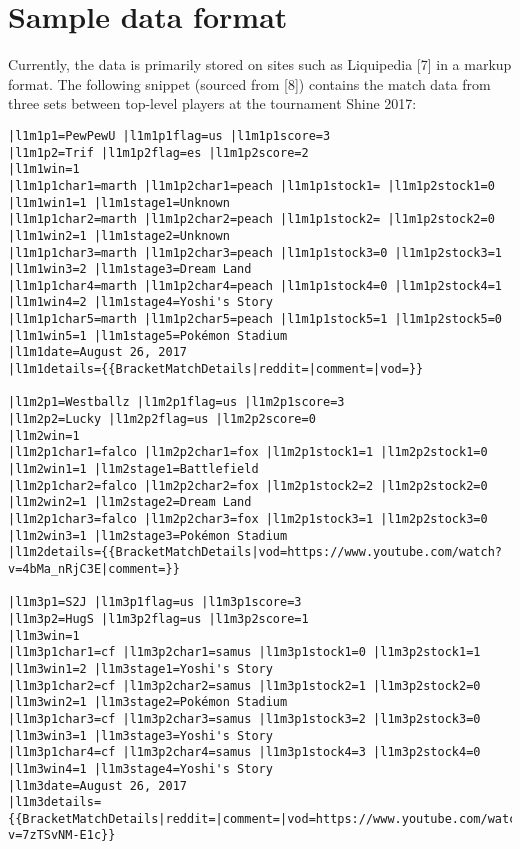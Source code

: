 \documentclass[10pt]{article}
\theoremstyle{definition}
\theoremstyle{remark}
\begin{document}
\hypertarget{sample-data-format}{%
\section{Sample data format}\label{sample-data-format}}

Currently, the data is primarily stored on sites such as Liquipedia
{[}7{]} in a markup format. The following snippet (sourced from {[}8{]})
contains the match data from three sets between top-level players at the
tournament Shine 2017:

\begin{verbatim}
|l1m1p1=PewPewU |l1m1p1flag=us |l1m1p1score=3
|l1m1p2=Trif |l1m1p2flag=es |l1m1p2score=2
|l1m1win=1
|l1m1p1char1=marth |l1m1p2char1=peach |l1m1p1stock1= |l1m1p2stock1=0 |l1m1win1=1 |l1m1stage1=Unknown
|l1m1p1char2=marth |l1m1p2char2=peach |l1m1p1stock2= |l1m1p2stock2=0 |l1m1win2=1 |l1m1stage2=Unknown
|l1m1p1char3=marth |l1m1p2char3=peach |l1m1p1stock3=0 |l1m1p2stock3=1 |l1m1win3=2 |l1m1stage3=Dream Land
|l1m1p1char4=marth |l1m1p2char4=peach |l1m1p1stock4=0 |l1m1p2stock4=1 |l1m1win4=2 |l1m1stage4=Yoshi's Story
|l1m1p1char5=marth |l1m1p2char5=peach |l1m1p1stock5=1 |l1m1p2stock5=0 |l1m1win5=1 |l1m1stage5=Pokémon Stadium
|l1m1date=August 26, 2017
|l1m1details={{BracketMatchDetails|reddit=|comment=|vod=}}

|l1m2p1=Westballz |l1m2p1flag=us |l1m2p1score=3
|l1m2p2=Lucky |l1m2p2flag=us |l1m2p2score=0
|l1m2win=1
|l1m2p1char1=falco |l1m2p2char1=fox |l1m2p1stock1=1 |l1m2p2stock1=0 |l1m2win1=1 |l1m2stage1=Battlefield
|l1m2p1char2=falco |l1m2p2char2=fox |l1m2p1stock2=2 |l1m2p2stock2=0 |l1m2win2=1 |l1m2stage2=Dream Land
|l1m2p1char3=falco |l1m2p2char3=fox |l1m2p1stock3=1 |l1m2p2stock3=0 |l1m2win3=1 |l1m2stage3=Pokémon Stadium
|l1m2details={{BracketMatchDetails|vod=https://www.youtube.com/watch?v=4bMa_nRjC3E|comment=}}

|l1m3p1=S2J |l1m3p1flag=us |l1m3p1score=3
|l1m3p2=HugS |l1m3p2flag=us |l1m3p2score=1
|l1m3win=1
|l1m3p1char1=cf |l1m3p2char1=samus |l1m3p1stock1=0 |l1m3p2stock1=1 |l1m3win1=2 |l1m3stage1=Yoshi's Story
|l1m3p1char2=cf |l1m3p2char2=samus |l1m3p1stock2=1 |l1m3p2stock2=0 |l1m3win2=1 |l1m3stage2=Pokémon Stadium
|l1m3p1char3=cf |l1m3p2char3=samus |l1m3p1stock3=2 |l1m3p2stock3=0 |l1m3win3=1 |l1m3stage3=Yoshi's Story
|l1m3p1char4=cf |l1m3p2char4=samus |l1m3p1stock4=3 |l1m3p2stock4=0 |l1m3win4=1 |l1m3stage4=Yoshi's Story
|l1m3date=August 26, 2017
|l1m3details={{BracketMatchDetails|reddit=|comment=|vod=https://www.youtube.com/watch?v=7zTSvNM-E1c}}
\end{verbatim}
\end{document}
